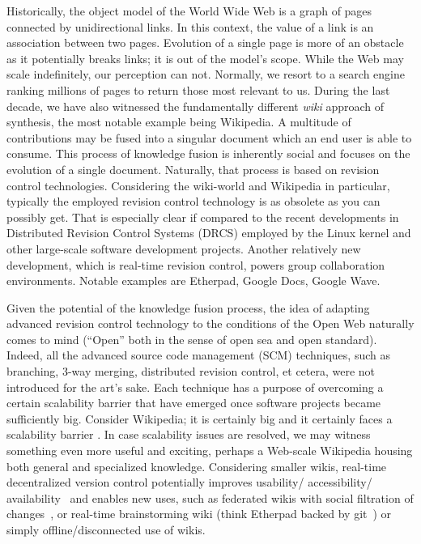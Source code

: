 \documentclass{acm_proc_article-sp}
\begin{document}
Historically, the object model of the World Wide Web is a graph of pages connected by unidirectional links.
In this context, the value of a link is an association between two pages.
Evolution of a single page is more of an obstacle as it potentially breaks links; it is out of the model's scope.
While the Web may scale indefinitely, our perception can not. 
Normally, we resort to a search engine ranking millions of pages to return those most relevant to us.
During the last decade, we have also witnessed the fundamentally different \emph{wiki} approach of synthesis, the most notable example being Wikipedia.
A multitude of contributions may be fused into a singular document which an end user is able to consume.
This process of knowledge fusion is inherently social and focuses on the evolution of a single document.
Naturally, that process is based on revision control technologies.
Considering the wiki-world and Wikipedia in particular, typically the employed revision control technology is as obsolete as you can possibly get.
That is especially clear if compared to the recent developments in Distributed Revision Control Systems (DRCS) employed by the Linux kernel and other large-scale software development projects.
Another relatively new development, which is real-time revision control, powers group collaboration environments. Notable examples are Etherpad, Google Docs, Google Wave.

Given the potential of the knowledge fusion process, the idea of adapting advanced revision control technology to the conditions of the Open Web naturally comes to mind (``Open'' both in the sense of open sea and open standard). 
Indeed, all the advanced source code management (SCM) techniques, such as branching, 3-way merging, distributed revision control, et cetera, were not introduced for the art's sake.
Each technique has a purpose of overcoming a certain scalability barrier that have emerged once software projects became sufficiently big. 
Consider Wikipedia; it is certainly big and it certainly faces a scalability barrier \cite{no-singularity, wp-decay}.
In case scalability issues are resolved, we may witness something even more useful and exciting, perhaps  a Web-scale Wikipedia housing both general and specialized knowledge.
Considering smaller wikis, real-time decentralized version control potentially improves usability/ accessibility/ availability~\cite{nahaboo} and enables new uses, such as federated wikis with social filtration of changes~\cite{www06}, or real-time brainstorming wiki (think Etherpad backed by git~\cite{git}) or simply offline/disconnected use of wikis.
\end{document}

